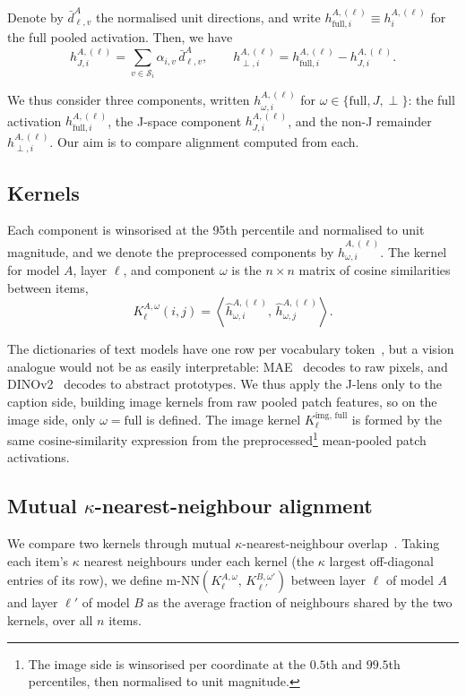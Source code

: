 \documentclass{article}
\newcommand{\img}{\mathrm{img}}
\newcommand{\fl}{\mathrm{full}}
\newcommand{\mnn}{\mathrm{m\text{-}NN}}
\begin{document}
Denote by $\bar{d}^A_{\ell,v}$ the normalised unit directions, and write $h^{A,(\ell)}_{\fl,i} \equiv h^{A,(\ell)}_i$ for the full pooled activation. Then, we have
\[
  h^{A,(\ell)}_{J,i} = \sum_{v \in \mathcal{S}_i} \alpha_{i,v}\, \bar{d}^A_{\ell,v},
  \qquad
  h^{A,(\ell)}_{\perp,i} = h^{A,(\ell)}_{\fl,i} - h^{A,(\ell)}_{J,i}.
\]

We thus consider three components, written $h^{A,(\ell)}_{\omega,i}$ for
$\omega \in \{\fl, J, \perp\}$: the full activation $h^{A,(\ell)}_{\fl,i}$, the
J-space component $h^{A,(\ell)}_{J,i}$, and the non-J remainder
$h^{A,(\ell)}_{\perp,i}$. Our aim is to compare alignment computed from each.

\subsection{Kernels}
Each component is winsorised at the 95th percentile and normalised to unit magnitude, and we denote the preprocessed components by $\hat{h}^{A,(\ell)}_{\omega,i}$. The kernel for model $A$, layer $\ell$, and component $\omega$ is the $n \times n$ matrix of cosine similarities between items, 
\[
  K^{A,\omega}_{\ell}(i,j)
  =
  \left \langle \hat{h}^{A,(\ell)}_{\omega,i},\, \hat{h}^{A,(\ell)}_{\omega,j} \right\rangle.
\]

The dictionaries of text models have one row per vocabulary token~\citep{geva2022transformer,dar2023analyzing}, but a vision analogue would not be as easily interpretable: MAE~\citep{he2021maskedautoencodersscalablevision} decodes to raw pixels, and DINOv2~\citep{oquab2024dinov2learningrobustvisual} 
decodes to abstract prototypes. We thus apply the J-lens only to the caption side, building image kernels from
raw pooled patch features, so on the image side, only $\omega = \fl$ is defined. The image kernel $K^{\img,\,\fl}_{\ell}$ is formed by the same cosine-similarity expression from the preprocessed\footnote{The image side is winsorised per coordinate at the $0.5$th and $99.5$th percentiles, then normalised to unit magnitude.} mean-pooled patch activations.

\subsection{Mutual \texorpdfstring{$\kappa$}{kappa}-nearest-neighbour alignment}
We compare two kernels through mutual $\kappa$-nearest-neighbour overlap~\citep{bestbuddies}. Taking each item's $\kappa$ nearest neighbours under each kernel (the $\kappa$ largest off-diagonal entries of its row), we define $\mnn(K^{A,\omega}_{\ell},\, K^{B,\omega'}_{\ell'})$ between layer $\ell$ of model $A$ and layer $\ell'$ of model $B$ as the average fraction of neighbours shared by the two kernels, over all $n$ items.
\end{document}
